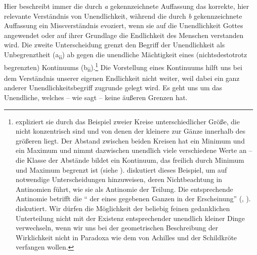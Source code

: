 Hier beschreibt immer die durch \emph{a} gekennzeichnete Auffassung
das korrekte, hier relevante Verständnis von Unendlichkeit, während
die durch \emph{b} gekennzeichnete Auffassung ein Missverständnis
evoziert, wenn sie auf die Unendlichkeit Gottes angewendet oder auf
ihrer Grundlage die Endlichkeit des Menschen verstanden wird.
Die zweite Unterscheidung grenzt den Begriff der Unendlichkeit als
Unbegrenztheit (a\textsubscript{ii}) ab gegen die unendliche Mächtigkeit eines (nichtsdestotrotz
begrenzten) Kontinuums (b\textsubscript{ii}).\footnote{
expliziert sie durch das Beispiel zweier Kreise unterschiedlicher Größe, die nicht
konzentrisch sind und von denen der kleinere zur Gänze innerhalb des größeren
liegt. Der Abstand zwischen beiden Kreisen hat ein Minimum und ein Maximum und
nimmt dazwischen unendlich viele verschiedene Werte an -- die Klasse der
Abstände bildet ein Kontinuum, das freilich durch Minimum und Maximum begrenzt
ist \mkbibparens{siehe \cite[][IV: 58.33--59.26]{Spinoza:SpinozaOpera1972}}.
 diskutiert dieses Beispiel, um auf
notwendige Unterscheidungen hinzuweisen, deren Nichtbeachtung in Antinomien
führt, wie sie  als Antinomie der Teilung. Die
entsprechende Antinomie betrifft die \enquote{ der
 eines gegebenen Ganzen in der Erscheinung} \mkbibparens{\cite[][B
443]{Kant:KritikderreinenVernunft2003}, \cite[][III:
287.7--10]{Kant:GesammelteWerke1900ff.}}. diskutiert. Wir dürfen die
Möglichkeit der beliebig feinen gedanklichen Unterteilung nicht mit der Existenz
entsprechender unendlich kleiner Dinge verwechseln, wenn wir uns bei der
geometrischen Beschreibung der Wirklichkeit nicht in Paradoxa wie dem von
Achilles und der Schildkröte verfangen wollen.}
Die Vorstellung eines Kontinuums hilft uns bei dem Verständnis unserer eigenen
Endlichkeit nicht weiter, weil dabei ein ganz anderer Unendlichkeitsbegriff
zugrunde gelegt wird. Es geht uns um das Unendliche, welches -- wie
 sagt -- keine äußeren Grenzen
hat.

